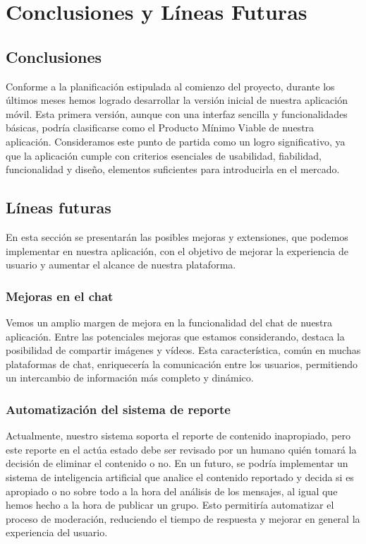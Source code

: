 \chapter{Conclusiones y Líneas Futuras}
    \section{Conclusiones}
        Conforme a la planificación estipulada al comienzo del proyecto, durante los últimos meses hemos logrado desarrollar la versión inicial de nuestra aplicación móvil. Esta primera versión, aunque con una interfaz sencilla y funcionalidades básicas, podría clasificarse como el Producto Mínimo Viable\cite{REF6} de nuestra aplicación. Consideramos este punto de partida como un logro significativo, ya que la aplicación cumple con criterios esenciales de usabilidad, fiabilidad, funcionalidad y diseño, elementos suficientes para introducirla en el mercado.

        \section{Líneas futuras}
            En esta sección se presentarán las posibles mejoras y extensiones, que podemos implementar en nuestra aplicación, con el objetivo de mejorar la experiencia de usuario y aumentar el alcance de nuestra plataforma.
  
        \subsection{Mejoras en el chat}
            Vemos un amplio margen de mejora en la funcionalidad del chat de nuestra aplicación. Entre las potenciales mejoras que estamos considerando, destaca la posibilidad de compartir imágenes y vídeos. Esta característica, común en muchas plataformas de chat, enriquecería la comunicación entre los usuarios, permitiendo un intercambio de información más completo y dinámico.
            
        \subsection{Automatización del sistema de reporte}
            Actualmente, nuestro sistema soporta el reporte de contenido inapropiado, pero este reporte en el actúa estado debe ser revisado por un humano quién tomará la decisión de eliminar el contenido o no. En un futuro, se podría implementar un sistema de inteligencia artificial que analice el contenido reportado y decida si es apropiado o no sobre todo a la hora del análisis de los mensajes, al igual que hemos hecho a la hora de publicar un grupo. Esto permitiría automatizar el proceso de moderación, reduciendo el tiempo de respuesta y mejorar en general la experiencia del usuario.

